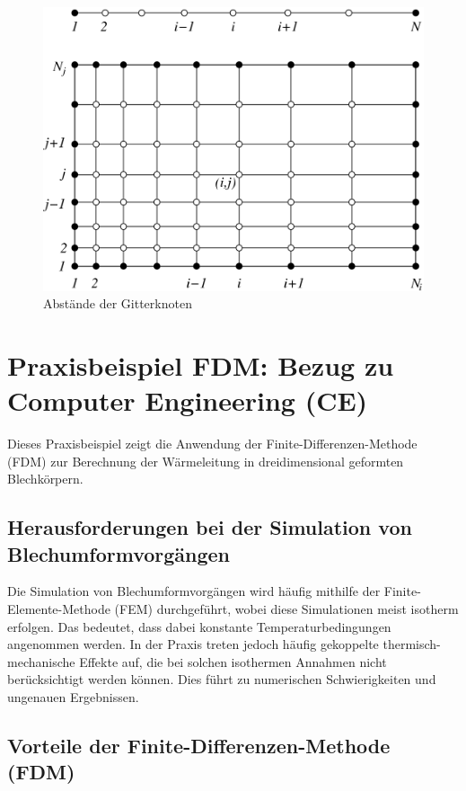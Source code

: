 \begin{figure}[h]
    \centering
    \includegraphics[scale=0.35]{images/Gitterknoten.png}
    \caption{Abstände der Gitterknoten}
    \label{fig:Gitterknoten-Abstände}
\end{figure}

\section{Praxisbeispiel FDM: Bezug zu Computer Engineering (CE)}

Dieses Praxisbeispiel zeigt die Anwendung der Finite-Differenzen-Methode (FDM) zur Berechnung der Wärmeleitung in dreidimensional geformten Blechkörpern\textsc{\cite{Praxisbeispiel_1}}.

\subsection{Herausforderungen bei der Simulation von Blechumformvorgängen}

Die Simulation von Blechumformvorgängen wird häufig mithilfe der Finite-Elemente-Methode (FEM) durchgeführt, wobei diese Simulationen meist isotherm erfolgen. Das bedeutet, dass dabei konstante Temperaturbedingungen angenommen werden. In der Praxis treten jedoch häufig gekoppelte thermisch-mechanische Effekte auf, die bei solchen isothermen Annahmen nicht berücksichtigt werden können. Dies führt zu numerischen Schwierigkeiten und ungenauen Ergebnissen.

\subsection{Vorteile der Finite-Differenzen-Methode (FDM)}

